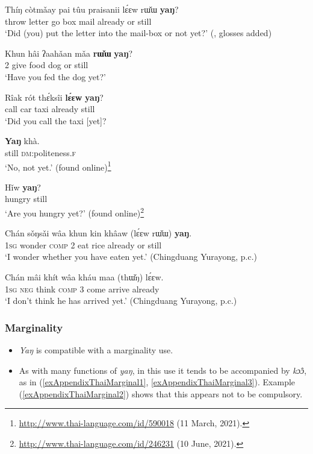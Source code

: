\begin{exe}
	\ex \label{exAppendixThaiNotYet1} 
	\gll Thíŋ		còtmǎay	pai	tûu	praisanii	lɛ́ɛw		rɯ̌ɯ	\textbf{yaŋ}?\\
	throw letter go box mail already or still\\
	\glt \lq Did (you) put the letter into the mail-box or not yet?\rq{ }(\cite[500]{Koelver1991}, glosses added)

	\ex\label{exAppendixThaiNotYet3}
	\gll Khun	hâi	ʔaahǎan	mǎa	\textbf{rɯ̌ɯ}	\textbf{yaŋ}?\\
	2 give food dog or still\\
	\glt \lq Have you fed the dog yet?' \parencite[80]{Smyth2002}

	\ex\label{exAppendixThaiNotYet4}
	\begin{xlist}
		 \gll Rîak	rót	thɛ́ksîi	\textbf{lɛ́ɛw}		\textbf{yaŋ}?\\
		call car taxi already still\\
		\glt \lq Did you call the taxi [yet]?

		 \gll \textbf{Yaŋ}	khà.\\
		still \textsc{dm}:politeness.\textsc{f}\\
		\glt \lq No, not yet.' (found online)\footnote{\url{http://www.thai-language.com/id/590018} (11 March, 2021).}
	\end{xlist}


	\ex
	\label{exAppendixThaiNotYet5}
	\gll Hǐw		\textbf{yaŋ}?\\
	 hungry still\\
	 \glt \lq Are you hungry yet?' (found online)\footnote{\url{http://www.thai-language.com/id/246231} (10 June, 2021).}
	 
 	\ex
	\label{exAppendixThaiNotYet6}
	\gll Chán	sǒŋsǎi	wâa		khun	kin	khâaw	\textup{(}lɛ́ɛw		rɯ̌ɯ\textup{)}		\textbf{yaŋ}.\\
	1\textsc{sg} wonder \textsc{comp} 2 eat rice \phantom{(}already or still\\
	\glt \lq I wonder whether you have eaten yet.' (Chingduang Yurayong, p.c.)
	
	\ex
	\label{exAppendixThaiNotYet7}
	\gll Chán	mâi	khít	wâa		kháu	maa		(thɯ̌ŋ)	lɛ́ɛw.\\
	1\textsc{sg} \textsc{neg} think \textsc{comp} 3 come \phantom{(}arrive already\\
	\glt \lq I don't think he has arrived yet.' (Chingduang Yurayong, p.c.)
\end{exe}


\pagebreak
\subsubsection{Marginality}
\label{appendixThaiMarginal}
\begin{itemize}
	\item \textit{Yaŋ} is compatible with a marginality use.
	\item As with many functions of \textit{yaŋ}, in this use it tends to be accompanied by \textit{kɔ̂ɔ}, as in (\ref{exAppendixThaiMarginal1}, \ref{exAppendixThaiMarginal3}).  Example (\ref{exAppendixThaiMarginal2}) shows that this appears not to be compulsory.
\end{itemize}

